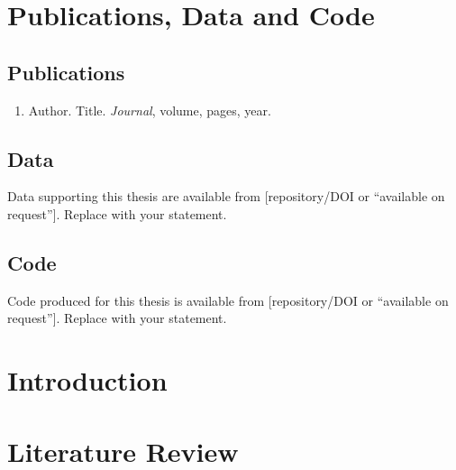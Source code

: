 \chapter{Publications, Data and Code}

\section{Publications}
\begin{enumerate}
  \item Author. Title. \textit{Journal}, volume, pages, year.~\citep{example-paper}
\end{enumerate}

\section{Data}
Data supporting this thesis are available from [repository/DOI or ``available on request'']. Replace with your statement.

\section{Code}
Code produced for this thesis is available from [repository/DOI or ``available on request'']. Replace with your statement.

\mainmatter

\chapter{Introduction}\label{ch1}


\chapter{Literature Review}\label{ch2}


